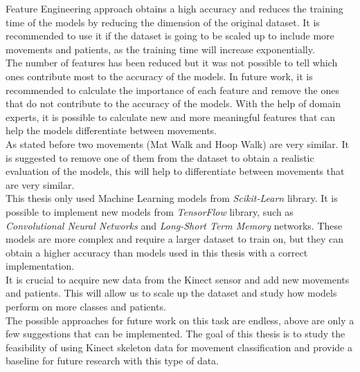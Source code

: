         Feature Engineering approach obtains a high accuracy and reduces the training time of the models by reducing the dimension of the original dataset. It is recommended to use it if the dataset is going to be scaled up to include more movements and patients, as the training time will increase exponentially.\\
        The number of features has been reduced but it was not possible to tell which ones contribute most to the accuracy of the models. In future work, it is recommended to calculate the importance of each feature and remove the ones that do not contribute to the accuracy of the models. With the help of domain experts, it is possible to calculate new and more meaningful features that can help the models differentiate between movements. \\
        As stated before two movements (Mat Walk and Hoop Walk) are very similar. It is suggested to remove one of them from the dataset to obtain a realistic evaluation of the models, this will help to differentiate between movements that are very similar.\\
        
        This thesis only used Machine Learning models from \textit{Scikit-Learn} library. It is possible to implement new models from \textit{TensorFlow} library, such as \textit{Convolutional Neural Networks} and \textit{Long-Short Term Memory} networks. These models are more complex and require a larger dataset to train on, but they can obtain a higher accuracy than models used in this thesis with a correct implementation. \\
        It is crucial to acquire new data from the Kinect sensor and add new movements and patients. This will allow us to scale up the dataset and study how models perform on more classes and patients. \\

        The possible approaches for future work on this task are endless, above are only a few suggestions that can be implemented. The goal of this thesis is to study the feasibility of using Kinect skeleton data for movement classification and provide a baseline for future research with this type of data. \\
    
    \cleardoublepage
